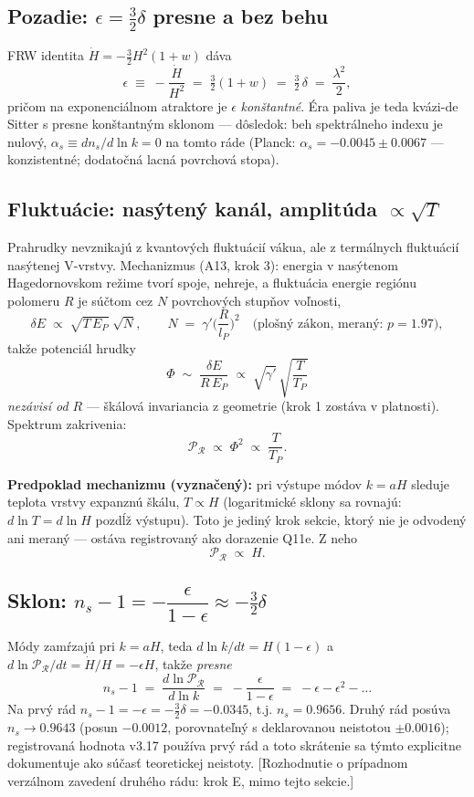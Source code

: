 \subsection{Pozadie: $\epsilon = \tfrac{3}{2}\delta$ presne a bez behu}

FRW identita $\dot H = -\tfrac{3}{2}H^2(1+w)$ dáva
\[
\epsilon \;\equiv\; -\frac{\dot H}{H^2} \;=\; \tfrac{3}{2}(1+w)
\;=\; \tfrac{3}{2}\,\delta \;=\; \frac{\lambda^2}{2},
\]
pričom na exponenciálnom atraktore je $\epsilon$ \emph{konštantné}.
Éra paliva je teda kvázi-de Sitter s presne konštantným sklonom ---
dôsledok: beh spektrálneho indexu je nulový,
$\alpha_s \equiv dn_s/d\ln k = 0$ na tomto ráde
(Planck: $\alpha_s = -0.0045 \pm 0.0067$ --- konzistentné; dodatočná
lacná povrchová stopa).

\subsection{Fluktuácie: nasýtený kanál, amplitúda $\propto \sqrt{T}$}

Prahrudky nevznikajú z kvantových fluktuácií vákua, ale z termálnych
fluktuácií nasýtenej V-vrstvy. Mechanizmus (A13, krok 3): energia
v nasýtenom Hagedornovskom režime tvorí spoje, nehreje, a fluktuácia
energie regiónu polomeru $R$ je súčtom cez $N$ povrchových stupňov
voľnosti,
\[
\delta E \;\propto\; \sqrt{T\,E_P}\;\sqrt{N},
\qquad
N \;=\; \gamma'\Big(\frac{R}{l_P}\Big)^{2}
\quad\text{(plošný zákon, meraný: } p=1.97\text{)},
\]
takže potenciál hrudky
\[
\Phi \;\sim\; \frac{\delta E}{R\,E_P}
\;\propto\; \sqrt{\gamma'}\,\sqrt{\frac{T}{T_P}}
\]
\emph{nezávisí od $R$} --- škálová invariancia z geometrie (krok 1
zostáva v platnosti). Spektrum zakrivenia:
\[
\mathcal{P}_{\mathcal{R}} \;\propto\; \Phi^2 \;\propto\; \frac{T}{T_P}.
\]

\textbf{Predpoklad mechanizmu (vyznačený):} pri výstupe módov
$k = aH$ sleduje teplota vrstvy expanznú škálu, $T \propto H$
(logaritmické sklony sa rovnajú: $d\ln T = d\ln H$ pozdĺž výstupu).
Toto je jediný krok sekcie, ktorý nie je odvodený ani meraný ---
ostáva registrovaný ako dorazenie Q11e. Z neho
\[
\mathcal{P}_{\mathcal{R}} \;\propto\; H .
\]

\subsection{Sklon: $n_s - 1 = -\dfrac{\epsilon}{1-\epsilon} \approx -\tfrac{3}{2}\delta$}

Módy zamŕzajú pri $k = aH$, teda
$d\ln k/dt = H(1-\epsilon)$ a
$d\ln\mathcal{P}_{\mathcal{R}}/dt = \dot H/H = -\epsilon H$, takže
\emph{presne}
\[
n_s - 1 \;=\; \frac{d\ln\mathcal{P}_{\mathcal{R}}}{d\ln k}
\;=\; -\frac{\epsilon}{1-\epsilon}
\;=\; -\epsilon - \epsilon^2 - \dots
\]
Na prvý rád $n_s - 1 = -\epsilon = -\tfrac{3}{2}\delta = -0.0345$,
t.j. $n_s = 0.9656$. Druhý rád posúva $n_s \to 0.9643$
(posun $-0.0012$, porovnateľný s deklarovanou neistotou
$\pm 0.0016$); registrovaná hodnota v3.17 používa prvý rád a toto
skrátenie sa týmto explicitne dokumentuje ako súčasť teoretickej
neistoty. [Rozhodnutie o prípadnom verzálnom zavedení druhého rádu:
krok E, mimo tejto sekcie.]


